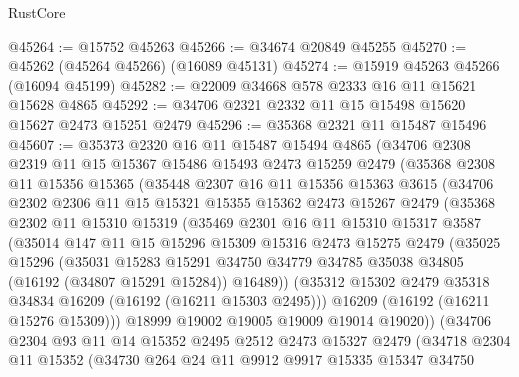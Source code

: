 \begin{lexlean}{RustCore}
\begin{coremodule}
@45264 := @15752 @45263
@45266 := @34674 @20849 @45255
@45270 := @45262 (@45264 @45266) (@16089 @45131)
@45274 := @15919 @45263 @45266 (@16094 @45199)
@45282 := @22009 @34668 @578 @2333 @16 @11 @15621 @15628 @4865
@45292 := @34706 @2321 @2332 @11 @15 @15498 @15620 @15627 @2473 @15251 @2479
@45296 := @35368 @2321 @11 @15487 @15496
@45607 := @35373
    @2320
    @16
    @11
    @15487
    @15494
    @4865
    (@34706
      @2308
      @2319
      @11
      @15
      @15367
      @15486
      @15493
      @2473
      @15259
      @2479
      (@35368
        @2308
        @11
        @15356
        @15365
        (@35448
          @2307
          @16
          @11
          @15356
          @15363
          @3615
          (@34706
            @2302
            @2306
            @11
            @15
            @15321
            @15355
            @15362
            @2473
            @15267
            @2479
            (@35368
              @2302
              @11
              @15310
              @15319
              (@35469
                @2301
                @16
                @11
                @15310
                @15317
                @3587
                (@35014
                  @147
                  @11
                  @15
                  @15296
                  @15309
                  @15316
                  @2473
                  @15275
                  @2479
                  (@35025
                    @15296
                    (@35031
                      @15283
                      @15291
                      @34750
                      @34779
                      @34785
                      @35038
                      @34805
                      (@16192 (@34807 @15291 @15284))
                      @16489))
                  (@35312 @15302 @2479 @35318 @34834 @16209 (@16192 (@16211 @15303 @2495)))
                  @16209
                  (@16192 (@16211 @15276 @15309)))
                @18999
                @19002
                @19005
                @19009
                @19014
                @19020))
            (@34706
              @2304
              @93
              @11
              @14
              @15352
              @2495
              @2512
              @2473
              @15327
              @2479
              (@34718
                @2304
                @11
                @15352
                (@34730
                  @264
                  @24
                  @11
                  @9912
                  @9917
                  @15335
                  @15347
                  @34750

\end{coremodule}
\end{lexlean}
